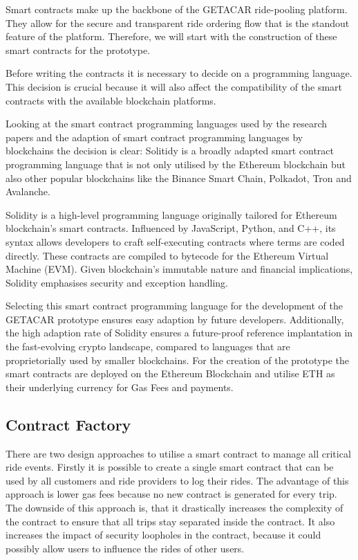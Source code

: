 Smart contracts make up the backbone of the GETACAR ride-pooling platform. They allow for the secure and transparent ride ordering flow that is the standout feature of the platform. Therefore, we will start with the construction of these smart contracts for the prototype. 

Before writing the contracts it is necessary to decide on a programming language. This decision is crucial because it will also affect the compatibility of the smart contracts with the available blockchain platforms. 

Looking at the smart contract programming languages used by the research papers and the adaption of smart contract programming languages by blockchains the decision is clear: Solitidy is a broadly adapted smart contract programming language that is not only utilised by the Ethereum blockchain but also other popular blockchains like the Binance Smart Chain, Polkadot, Tron and Avalanche. 

Solidity is a high-level programming language originally tailored for Ethereum blockchain's smart contracts. Influenced by JavaScript, Python, and C++, its syntax allows developers to craft self-executing contracts where terms are coded directly. These contracts are compiled to bytecode for the Ethereum Virtual Machine (EVM). Given blockchain's immutable nature and financial implications, Solidity emphasises security and exception handling. 

Selecting this smart contract programming language for the development of the GETACAR prototype ensures easy adaption by future developers. Additionally, the high adaption rate of Solidity ensures a future-proof reference implantation in the fast-evolving crypto landscape, compared to languages that are proprietorially used by smaller blockchains. For the creation of the prototype the smart contracts are deployed on the Ethereum Blockchain and utilise ETH as their underlying currency for Gas Fees and payments.

\subsection{Contract Factory}
There are two design approaches to utilise a smart contract to manage all critical ride events. Firstly it is possible to create a single smart contract that can be used by all customers and ride providers to log their rides. The advantage of this approach is lower gas fees because no new contract is generated for every trip. The downside of this approach is, that it drastically increases the complexity of the contract to ensure that all trips stay separated inside the contract. It also increases the impact of security loopholes in the contract, because it could possibly allow users to influence the rides of other users. 

